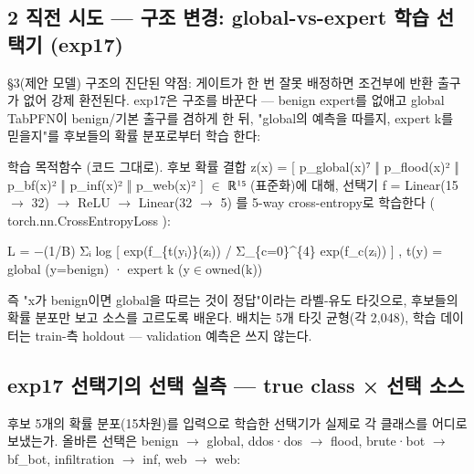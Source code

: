 \subsection*{2 직전 시도 — 구조 변경: global-vs-expert 학습 선택기 (exp17)}
§3(제안 모델) 구조의 진단된 약점: 게이트가 한 번 잘못 배정하면 조건부에 반환 출구가 없어 강제 환전된다. exp17은 구조를 바꾼다 — benign expert를 없애고 global TabPFN이 benign/\allowbreak{}기본 출구를 겸하게 한 뒤, "global의 예측을 따를지, expert k를 믿을지"를 후보들의 확률 분포로부터 학습 한다:

학습 목적함수 (코드 그대로). 후보 확률 결합 z(x) =\allowbreak{} [ p\_\allowbreak{}global(x)⁷ ‖ p\_\allowbreak{}flood(x)² ‖ p\_\allowbreak{}bf(x)² ‖ p\_\allowbreak{}inf(x)² ‖ p\_\allowbreak{}web(x)² ] \ensuremath{\in} ℝ¹⁵ (표준화)에 대해, 선택기 f =\allowbreak{} Linear(15 \ensuremath{\rightarrow} 32)  \ensuremath{\rightarrow}  ReLU  \ensuremath{\rightarrow}  Linear(32 \ensuremath{\rightarrow} 5) 를 5-way cross-entropy로 학습한다 ( torch.nn.CrossEntropyLoss ):

L =\allowbreak{} −(1/\allowbreak{}B) Σᵢ log [ exp(f\_\allowbreak{}\{t(yᵢ)\}(zᵢ)) /\allowbreak{} Σ\_\allowbreak{}\{c=\allowbreak{}0\}\textasciicircum{}\{4\} exp(f\_\allowbreak{}c(zᵢ)) ] , t(y) =\allowbreak{} global (y=\allowbreak{}benign) · expert k (y\ensuremath{\in}owned(k))

즉 "x가 benign이면 global을 따르는 것이 정답"이라는 라벨-유도 타깃으로, 후보들의 확률 분포만 보고 소스를 고르도록 배운다. 배치는 5개 타깃 균형(각 2,048), 학습 데이터는 train-측 holdout — validation 예측은 쓰지 않는다.

\subsection*{exp17 선택기의 선택 실측 — true class × 선택 소스}
후보 5개의 확률 분포(15차원)를 입력으로 학습한 선택기가 실제로 각 클래스를 어디로 보냈는가. 올바른 선택은 benign \ensuremath{\rightarrow} global, ddos·dos \ensuremath{\rightarrow} flood, brute·bot \ensuremath{\rightarrow} bf\_\allowbreak{}bot, infiltration \ensuremath{\rightarrow} inf, web \ensuremath{\rightarrow} web:

